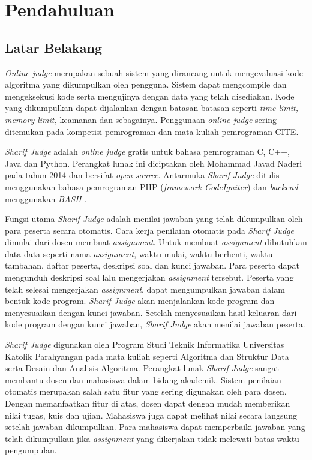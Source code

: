 \chapter{Pendahuluan}
\label{chap:intro}
   
\section{Latar Belakang}
\label{sec:label}
\textit{Online judge} merupakan sebuah sistem yang dirancang untuk mengevaluasi kode algoritma yang dikumpulkan oleh pengguna. Sistem dapat mengcompile dan mengeksekusi kode serta mengujinya dengan data yang telah disediakan. Kode yang dikumpulkan dapat dijalankan dengan batasan-batasan seperti \textit{time limit, memory limit,} keamanan dan sebagainya. Penggunaan \textit{online judge} sering ditemukan pada kompetisi pemrograman dan mata kuliah pemrograman CITE.

\textit{Sharif Judge} adalah \textit{online judge} gratis untuk bahasa pemrograman C, C++, Java dan Python. Perangkat lunak ini diciptakan oleh Mohammad Javad Naderi pada tahun 2014 dan bersifat \textit{open source}. Antarmuka \textit{Sharif Judge} ditulis menggunakan bahasa pemrograman PHP (\textit{framework CodeIgniter}) dan \textit{backend} menggunakan \textit{BASH} \cite{mjnaderi:14:sharifjudge}.

Fungsi utama \textit{Sharif Judge} adalah menilai jawaban yang telah dikumpulkan oleh para peserta secara otomatis. Cara kerja penilaian otomatis pada \textit{Sharif Judge} dimulai dari dosen membuat \textit{assignment}. Untuk membuat \textit{assignment} dibutuhkan data-data seperti nama \textit{assignment}, waktu mulai, waktu berhenti, waktu tambahan, daftar peserta, deskripsi soal dan kunci jawaban. Para peserta dapat mengunduh deskripsi soal lalu mengerjakan \textit{assignment} tersebut. Peserta yang telah selesai mengerjakan \textit{assignment}, dapat mengumpulkan jawaban dalam bentuk kode program. \textit{Sharif Judge} akan menjalankan kode program dan menyesuaikan dengan kunci jawaban. Setelah menyesuaikan hasil keluaran dari kode program dengan kunci jawaban, \textit{Sharif Judge} akan menilai jawaban peserta.

\textit{Sharif Judge} digunakan oleh Program Studi Teknik Informatika Universitas Katolik Parahyangan pada mata kuliah seperti Algoritma dan Struktur Data serta Desain dan Analisis Algoritma. Perangkat lunak \textit{Sharif Judge} sangat membantu dosen dan mahasiswa dalam bidang akademik. Sistem penilaian otomatis merupakan salah satu fitur yang sering digunakan oleh para dosen. Dengan memanfaatkan fitur di atas, dosen dapat dengan mudah memberikan nilai tugas, kuis dan ujian. Mahasiswa juga dapat melihat nilai secara langsung setelah jawaban dikumpulkan. Para mahasiswa dapat memperbaiki jawaban yang telah dikumpulkan jika \textit{assignment} yang dikerjakan tidak melewati batas waktu pengumpulan.

